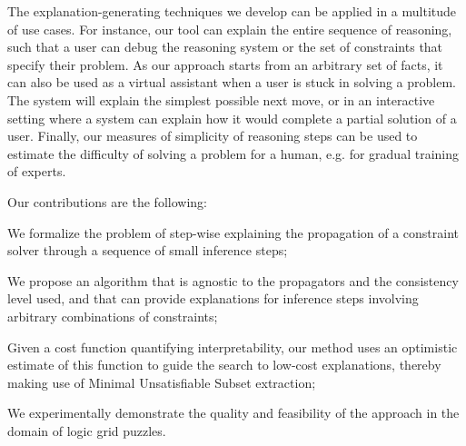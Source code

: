 The explanation-generating techniques we develop can be applied in a multitude of use cases. 
For instance, our tool can explain the entire sequence of reasoning, such that a user can debug the reasoning system or the set of constraints that specify their problem. 
As our approach starts from an arbitrary set of facts, it can also be used as a virtual assistant when a user is stuck in solving a problem.
The system will explain the simplest possible next move, or in an interactive setting where a system can explain how it would complete a partial solution of a user.
Finally, our measures of simplicity of reasoning steps can be used to estimate the difficulty of solving a problem for a human, e.g. for gradual training of experts.

\noindent Our contributions are the following:
\begin{compactitem}
	\item We formalize the problem of step-wise explaining the propagation of a constraint solver through a sequence of small inference steps;
	\item We propose an algorithm that is agnostic to the propagators and the consistency level used, and that can provide explanations for inference steps involving arbitrary combinations of constraints;
	\item Given a cost function quantifying interpretability, our method uses an optimistic estimate of this function to guide the search to low-cost explanations, thereby making use of Minimal Unsatisfiable Subset extraction;
	\item We experimentally demonstrate the quality and feasibility of the approach in the domain of logic grid puzzles.
\end{compactitem}

